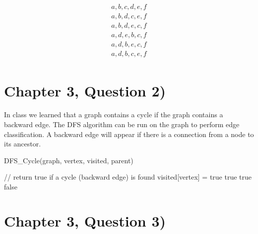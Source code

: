 \documentclass[11pt]{article}
\begin{document}
\begin{align*}
a, b, c, d, e, f \\
a, b, d, c, e, f\\
a, b, d, e, c, f\\
a, d, e, b, c, f\\
a, d, b, e, c, f\\
a, d, b, c, e, f \\
\end{align*}

\section{Chapter 3, Question 2)}
In class we learned that a graph contains a cycle if the graph contains a backward edge. The DFS algorithm can be run on the graph to perform edge classification. A backward edge will appear if there is a connection from a node to its ancestor.


\begin{algorithm}[H]
\caption{DFS\_Cycle(graph, vertex, visited, parent)}
\begin{algorithmic} 
\STATE // return true if a cycle (backward edge) is found
\STATE visited[vertex] = true
\RETURN true
\ENDIF
\ELSE
{}
\RETURN true
\ENDIF
\ENDIF
\ENDFOR
\RETURN false
\end{algorithmic}
\end{algorithm}

\section{Chapter 3, Question 3)}
\end{document}

